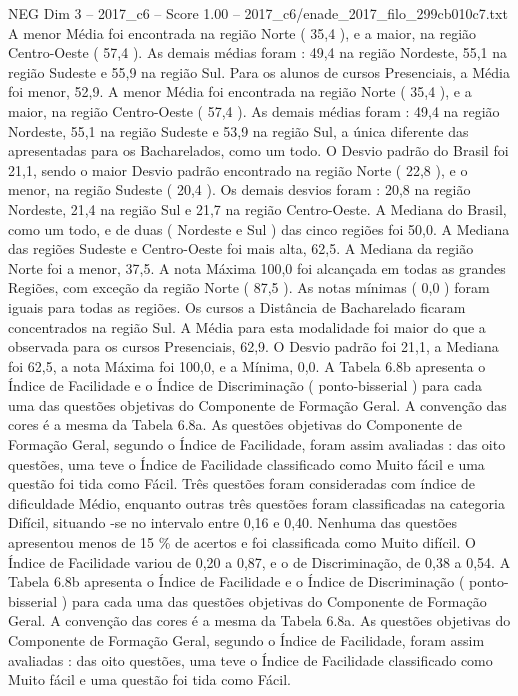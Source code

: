 \begin{textsample}{NEG Dim 3 – 2017\_c6 – Score 1.00 – 2017\_c6/enade\_2017\_filo\_299cb010c7.txt}
A menor Média foi encontrada na região Norte ( 35,4 ), e a maior, na região Centro-Oeste ( 57,4 ).
As demais médias foram : 49,4 na região Nordeste, 55,1 na região Sudeste e 55,9 na região Sul.
Para os alunos de cursos Presenciais, a Média foi menor, 52,9.
A menor Média foi encontrada na região Norte ( 35,4 ), e a maior, na região Centro-Oeste ( 57,4 ).
As demais médias foram : 49,4 na região Nordeste, 55,1 na região Sudeste e 53,9 na região Sul, a única diferente das apresentadas para os Bacharelados, como um todo.
O Desvio padrão do Brasil foi 21,1, sendo o maior Desvio padrão encontrado na região Norte ( 22,8 ), e o menor, na região Sudeste ( 20,4 ).
Os demais desvios foram : 20,8 na região Nordeste, 21,4 na região Sul e 21,7 na região Centro-Oeste.
A Mediana do Brasil, como um todo, e de duas ( Nordeste e Sul ) das cinco regiões foi 50,0.
A Mediana das regiões Sudeste e Centro-Oeste foi mais alta, 62,5.
A Mediana da região Norte foi a menor, 37,5.
A nota Máxima 100,0 foi alcançada em todas as grandes Regiões, com exceção da região Norte ( 87,5 ).
As notas mínimas ( 0,0 ) foram iguais para todas as regiões.
Os cursos a Distância de Bacharelado ficaram concentrados na região Sul.
A Média para esta modalidade foi maior do que a observada para os cursos Presenciais, 62,9.
O Desvio padrão foi 21,1, a Mediana foi 62,5, a nota Máxima foi 100,0, e a Mínima, 0,0.
A Tabela 6.8b apresenta o Índice de Facilidade e o Índice de Discriminação ( ponto-bisserial ) para cada uma das questões objetivas do Componente de Formação Geral.
A convenção das cores é a mesma da Tabela 6.8a.
As questões objetivas do Componente de Formação Geral, segundo o Índice de Facilidade, foram assim avaliadas : das oito questões, uma teve o Índice de Facilidade classificado como Muito fácil e uma questão foi tida como Fácil.
Três questões foram consideradas com índice de dificuldade Médio, enquanto outras três questões foram classificadas na categoria Difícil, situando -se no intervalo entre 0,16 e 0,40.
Nenhuma das questões apresentou menos de 15 \% de acertos e foi classificada como Muito difícil.
O Índice de Facilidade variou de 0,20 a 0,87, e o de Discriminação, de 0,38 a 0,54.
A Tabela 6.8b apresenta o Índice de Facilidade e o Índice de Discriminação ( ponto-bisserial ) para cada uma das questões objetivas do Componente de Formação Geral.
A convenção das cores é a mesma da Tabela 6.8a.
As questões objetivas do Componente de Formação Geral, segundo o Índice de Facilidade, foram assim avaliadas : das oito questões, uma teve o Índice de Facilidade classificado como Muito fácil e uma questão foi tida como Fácil.

\end{textsample}
